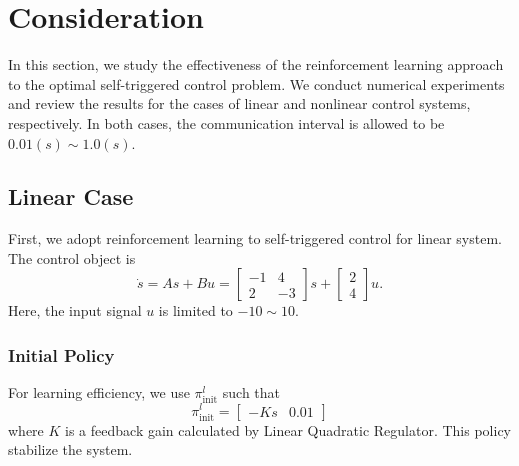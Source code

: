 \documentclass[english, dvipdfmx]{ampmt}             %
\begin{document}
\section{Consideration}
In this section, we study the effectiveness of the reinforcement learning approach to the optimal self-triggered control problem. We conduct numerical experiments and review the results for the cases of linear and nonlinear control systems, respectively. In both cases, the communication interval is allowed to be $0.01 (s) \sim 1.0 (s)$. 

\subsection{Linear Case}
First, we adopt reinforcement learning to self-triggered control for linear system. The control object is
\begin{equation}
	\dot{s} = As + Bu = \begin{bmatrix}-1& 4 \\ 2 & -3\end{bmatrix}s + \begin{bmatrix}2 \\ 4\end{bmatrix}u.
\end{equation}
Here, the input signal $u$ is limited to $-10 \sim 10$.

\subsubsection{Initial Policy}
For learning efficiency, we use $\pi^l_{\textrm{init}}$ such that
\begin{equation}
	\pi^l_{\textrm{init}} = \begin{bmatrix}-Ks&0.01\end{bmatrix}
\end{equation}
where $K$ is a feedback gain calculated by Linear Quadratic Regulator. This policy stabilize the system.
\end{document}
